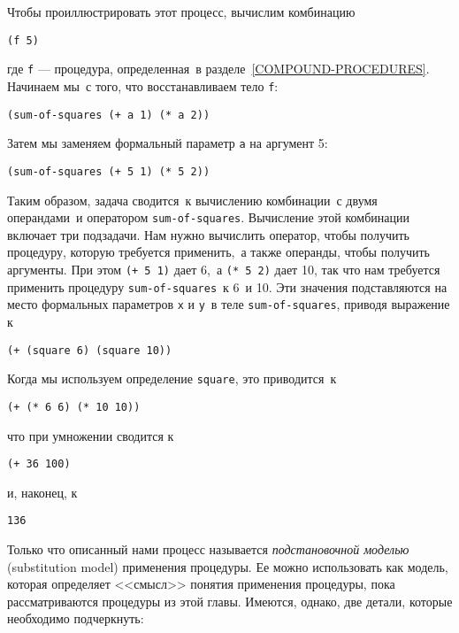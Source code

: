 Чтобы проиллюстрировать этот процесс, вычислим комбинацию

\begin{Verbatim}[fontsize=\small]
(f 5)
\end{Verbatim}
где {\tt f} --- процедура, определенная~в 
разделе~\ref{COMPOUND-PROCEDURES}.  Начинаем мы~с того, что
восстанавливаем тело {\tt f}:

\begin{Verbatim}[fontsize=\small]
(sum-of-squares (+ a 1) (* a 2))
\end{Verbatim}
Затем мы заменяем формальный параметр {\tt a} на
аргумент 5:

\begin{Verbatim}[fontsize=\small]
(sum-of-squares (+ 5 1) (* 5 2))
\end{Verbatim}
Таким образом, задача сводится~к вычислению комбинации~с двумя
операндами~и оператором {\tt sum-of-squares}.
Вычисление этой комбинации включает три подзадачи.  Нам нужно
вычислить оператор, чтобы получить процедуру, которую требуется
применить,~а также операнды, чтобы получить аргументы.  При этом
{\tt (+ 5 1)} дает 6,~а {\tt (* 5
2)} дает 10, так что нам требуется применить процедуру
{\tt sum-of-squares}~к 6~и 10.  Эти значения
подставляются на место формальных параметров {\tt x} и
{\tt y}~в теле {\tt sum-of-squares},
приводя выражение к

\begin{Verbatim}[fontsize=\small]
(+ (square 6) (square 10))
\end{Verbatim}
Когда мы используем определение {\tt square}, это
приводится~к 

\begin{Verbatim}[fontsize=\small]
(+ (* 6 6) (* 10 10))
\end{Verbatim}
что при умножении сводится к

\begin{Verbatim}[fontsize=\small]
(+ 36 100)
\end{Verbatim}
и, наконец, к

\begin{Verbatim}[fontsize=\small]
136
\end{Verbatim}

Только что описанный нами процесс называется
%
%
{\em подстановочной моделью} (substitution model) применения процедуры.
Ее можно использовать как модель, которая определяет <<смысл>>
понятия применения процедуры, пока рассматриваются процедуры из этой
главы.  Имеются, однако, две детали, которые необходимо подчеркнуть:

